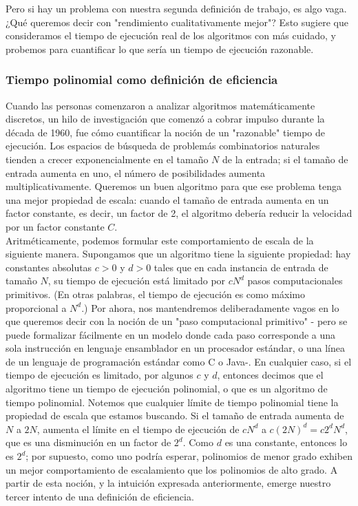 \documentclass[a4paper]{article}
\begin{document}
 Pero si hay un problema con nuestra segunda definición de trabajo, es algo vaga. ¿Qué queremos decir con "rendimiento cualitativamente mejor"? Esto sugiere que consideramos el tiempo de ejecución real de los algoritmos con más cuidado, y probemos para cuantificar lo que sería un tiempo de ejecución razonable. \\

\subsubsection*{Tiempo polinomial como definición de eficiencia} 

Cuando las personas comenzaron a analizar algoritmos matemáticamente discretos, un hilo de investigación que comenzó a cobrar impulso durante la década de 1960, fue cómo cuantificar la noción de un "razonable" tiempo de ejecución. Los espacios de búsqueda de problemás combinatorios naturales tienden a crecer exponencialmente en el tamaño $N$ de la entrada; si el tamaño de entrada aumenta en uno, el número de posibilidades aumenta multiplicativamente. Queremos un buen algoritmo para que ese problema tenga una mejor propiedad de escala: cuando el tamaño de entrada aumenta en un factor constante, es decir, un factor de 2, el algoritmo debería reducir la velocidad por un factor constante $C$. \\

Aritméticamente, podemos formular este comportamiento de escala de la siguiente manera. Supongamos que un algoritmo tiene la siguiente propiedad: hay constantes absolutas $c>0$ y $d>0$ tales que en cada instancia de entrada de tamaño $N$, su tiempo de ejecución está limitado por $cN^d$ pasos computacionales primitivos. (En otras palabras,  el tiempo de ejecución es como máximo proporcional a $N^d$.) Por ahora, nos mantendremos deliberadamente vagos en lo que queremos decir con la noción de un "paso computacional primitivo" - pero se puede formalizar fácilmente en un modelo donde cada paso corresponde a una sola instrucción en lenguaje ensamblador en un procesador estándar, o una línea de un lenguaje de programación estándar como C o Java-. En cualquier caso, si el tiempo de ejecución es limitado, por algunos $c$ y $d$, entonces decimos que el algoritmo tiene un tiempo de ejecución polinomial, o que es un algoritmo de tiempo polinomial. Notemos que cualquier límite de tiempo polinomial tiene la propiedad de escala que estamos buscando. Si el tamaño de entrada aumenta de $N$ a $2N$, aumenta el límite en el tiempo de ejecución de $cN^d$ a $c(2N)^d = c2^dN^d$, que es una disminución en un factor de $2^d$. Como $d$ es una constante, entonces lo es $2^d$; por supuesto, como uno podría esperar, polinomios de menor grado exhiben un mejor comportamiento de escalamiento que los polinomios de alto grado. A partir de esta noción, y la intuición expresada anteriormente, emerge nuestro tercer intento de una definición de eficiencia. \\
\end{document}
